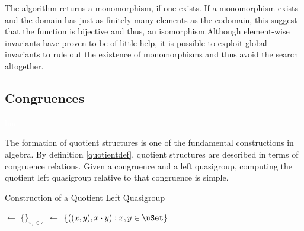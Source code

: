 \documentclass{mcom-l}
\begin{document}
\noindent The algorithm returns a monomorphism, if one exists.\newline
\noindent If a monomorphism exists and the domain has just as finitely many elements as the codomain, this suggest that the function is bijective and thus, an isomorphism.\newline Although element-wise invariants have proven to be of little help, it is possible to exploit global invariants to rule out the existence of monomorphisms and thus avoid the search altogether.\newline\newline



\subsection{Congruences}\textcolor{white}{line}


\noindent The formation of quotient structures is one of the fundamental constructions in algebra. By definition \ref{quotientdef}, quotient structures are described in terms of congruence relations.
\noindent Given a congruence and a left quasigroup, computing the quotient left quasigroup relative to that congruence is simple.  


\begin{algorithm}[H]

\DontPrintSemicolon
{}
\caption{Construction of a Quotient Left Quasigroup}


\BlankLine
\BlankLine
\uSet $\leftarrow$ $\{$$\}_{\pi_i \in \pi }$\;
\Graph $\leftarrow$ $\{((x,y), x\cdot y) : x,y \in \uSet\}$\;
\end{algorithm}
\end{document}
